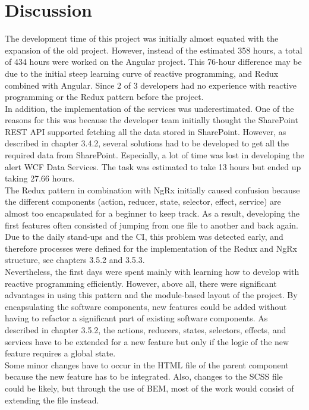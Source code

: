 \documentclass[Bachelor,BIF,english]{twbook}
\begin{document}
\chapter{Discussion}
The development time of this project was initially almost equated with the expansion of the old project. However, instead of the estimated 358 hours, a total of 434 hours were worked on the Angular project. This 76-hour difference may be due to the initial steep learning curve of reactive programming, and Redux combined with Angular. Since 2 of 3 developers had no experience with reactive programming or the Redux pattern before the project.
\\[\baselineskip]
In addition, the implementation of the services was underestimated. One of the reasons for this was because the developer team initially thought the SharePoint REST API supported fetching all the data stored in SharePoint. However, as described in chapter 3.4.2, several solutions had to be developed to get all the required data from SharePoint. Especially, a lot of time was lost in developing the alert WCF Data Services. The task was estimated to take 13 hours but ended up taking 27.66 hours.
\\[\baselineskip]
The Redux pattern in combination with NgRx initially caused confusion because the different components (action, reducer, state, selector, effect, service) are almost too encapsulated for a beginner to keep track. As a result, developing the first features often consisted of jumping from one file to another and back again. Due to the daily stand-ups and the CI, this problem was detected early, and therefore processes were defined for the implementation of the Redux and NgRx structure, see chapters 3.5.2 and 3.5.3.
\\[\baselineskip]
Nevertheless, the first days were spent mainly with learning how to develop with reactive programming efficiently. However, above all, there were significant advantages in using this pattern and the module-based layout of the project. By encapsulating the software components, new features could be added without having to refactor a significant part of existing software components. As described in chapter 3.5.2, the actions, reducers, states, selectors, effects, and services have to be extended for a new feature but only if the logic of the new feature requires a global state.
\\[\baselineskip]
Some minor changes have to occur in the HTML file of the parent component because the new feature has to be integrated. Also, changes to the SCSS file could be likely, but through the use of BEM, most of the work would consist of extending the file instead. 
\end{document}
